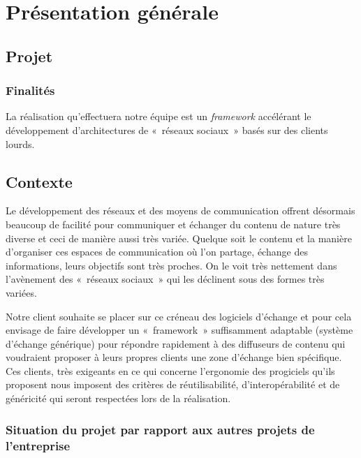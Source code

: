 \section{Présentation générale}
\subsection{Projet}
\subsubsection{Finalités}

La réalisation qu'effectuera notre équipe est un \textit{framework} accélérant le développement d'architectures de «~réseaux sociaux~» basés sur des clients lourds.


\subsection{Contexte}

Le développement des réseaux et des moyens de communication offrent désormais beaucoup de facilité pour communiquer et échanger du contenu de nature très diverse et ceci de manière aussi très variée. Quelque soit le contenu et la manière d’organiser ces espaces de communication où l’on partage, échange des informations, leurs objectifs sont très proches.
On le voit très nettement dans l’avènement des «~réseaux sociaux~» qui les déclinent sous des formes très variées.

Notre client souhaite se placer sur ce créneau des logiciels d’échange et pour cela envisage de faire développer un «~framework~» suffisamment adaptable (système d’échange générique) pour répondre rapidement à des diffuseurs de contenu qui voudraient proposer à leurs propres clients une zone d’échange bien spécifique. Ces clients, très exigeants en ce qui concerne l’ergonomie des progiciels qu’ils proposent nous imposent des critères de réutilisabilité, d'interopérabilité et de généricité qui seront respectées lors de la réalisation.

\subsubsection{Situation du projet par rapport aux autres projets de l’entreprise}

